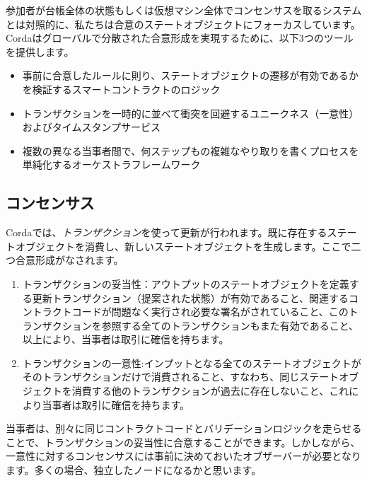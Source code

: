 \documentclass{article}
\begin{document}
参加者が台帳全体の状態もしくは仮想マシン全体でコンセンサスを取るシステムとは対照的に、私たちは合意のステートオブジェクトにフォーカスしています。Cordaはグローバルで分散された合意形成を実現するために、以下3つのツールを提供します。
\begin{itemize}
    \item 事前に合意したルールに則り、ステートオブジェクトの遷移が有効であるかを検証するスマートコントラクトのロジック
    \item トランザクションを一時的に並べて衝突を回避するユニークネス（一意性）およびタイムスタンプサービス
    \item 複数の異なる当事者間で、何ステップもの複雑なやり取りを書くプロセスを単純化するオーケストラフレームワーク
 \end{itemize}
\subsection{コンセンサス}
Cordaでは、\textit{トランザクション}を使って更新が行われます。既に存在するステートオブジェクトを消費し、新しいステートオブジェクトを生成します。ここで二つ合意形成がなされます。
\begin{enumerate}
\item{トランザクションの妥当性：アウトプットのステートオブジェクトを定義する更新トランザクション（提案された状態）が有効であること、関連するコントラクトコードが問題なく実行され必要な署名がされていること、このトランザクションを参照する全てのトランザクションもまた有効であること、以上により、当事者は取引に確信を持ちます。}
\item{トランザクションの一意性:インプットとなる全てのステートオブジェクトがそのトランザクションだけで消費されること、すなわち、同じステートオブジェクトを消費する他のトランザクションが過去に存在しないこと、これにより当事者は取引に確信を持ちます。}
\end{enumerate}
当事者は、別々に同じコントラクトコードとバリデーションロジックを走らせることで、トランザクションの妥当性に合意することができます。しかしながら、一意性に対するコンセンサスには事前に決めておいたオブザーバーが必要となります。多くの場合、独立したノードになるかと思います。
\end{document}
